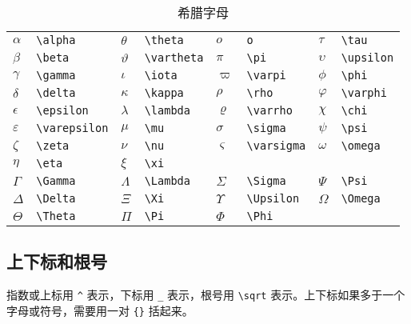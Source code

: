 \begin{table}[htbp]
\caption{希腊字母}
\label{tab:greek}
\centering
\begin{tabular}{llllllll}
    \toprule
    $\alpha$      & \verb|\alpha|      & $\theta$    & \verb|\theta|    & 
        $o$         & \verb|o|        & $\tau$     & \verb|\tau| \\
    $\beta$       & \verb|\beta|       & $\vartheta$ & \verb|\vartheta| & 
        $\pi$       & \verb|\pi|      & $\upsilon$ & \verb|\upsilon| \\
    $\gamma$      & \verb|\gamma|      & $\iota$     & \verb|\iota|     & 
        $\varpi$    & \verb|\varpi|   & $\phi$     & \verb|\phi| \\
    $\delta$      & \verb|\delta|      & $\kappa$    & \verb|\kappa|    & 
        $\rho$      & \verb|\rho|     & $\varphi$  & \verb|\varphi| \\
    $\epsilon$    & \verb|\epsilon|    & $\lambda$   & \verb|\lambda|   & 
        $\varrho$   & \verb|\varrho|  & $\chi$     & \verb|\chi| \\
    $\varepsilon$ & \verb|\varepsilon| & $\mu$       & \verb|\mu|       & 
        $\sigma$    & \verb|\sigma|   & $\psi$     & \verb|\psi| \\
    $\zeta$       & \verb|\zeta|       & $\nu$       & \verb|\nu|       & 
        $\varsigma$ & \verb|\varsigma|   & $\omega$   & \verb|\omega| \\
    $\eta$        & \verb|\eta|        & $\xi$       & \verb|\xi|       & 
        &                 &            & \\
    $\Gamma$      & \verb|\Gamma|      & $\Lambda$   & \verb|\Lambda|   & 
        $\Sigma$    & \verb|\Sigma|   & $\Psi$     & \verb|\Psi| \\
    $\Delta$      & \verb|\Delta|      & $\Xi$       & \verb|\Xi|       & 
        $\Upsilon$  & \verb|\Upsilon| & $\Omega$   & \verb|\Omega| \\
    $\Theta$      & \verb|\Theta|      & $\Pi$       & \verb|\Pi|       & 
        $\Phi$      & \verb|\Phi|     &            & \\
    \bottomrule
\end{tabular}
\end{table}

\subsection{上下标和根号}

指数或上标用 \verb|^| 表示，下标用 \verb|_| 表示，根号用 \verb|\sqrt| 表示。上下标如果多于一个字母或符号，需要用一对 \verb|{}| 括起来。

